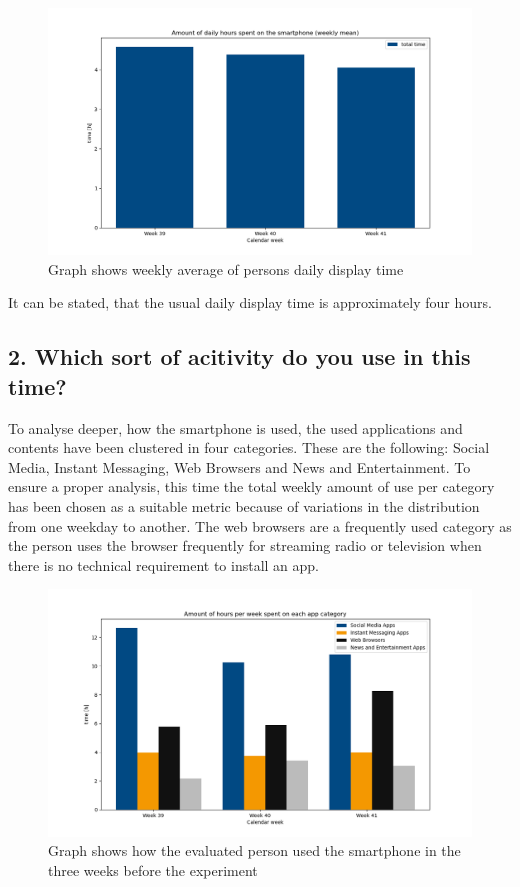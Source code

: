 \documentclass[11pt,letterpaper]{article}
\begin{document}
\begin{figure}[h]
\centering
\includegraphics[width = \textwidth]{../data/usage-times-total.png}
\caption{Graph shows weekly average of persons daily display time}
\end{figure}

It can be stated, that the usual daily display time is approximately four hours.

\subsection*{2. Which sort of acitivity do you use in this time?}
To analyse deeper, how the smartphone is used, the used applications and contents have been clustered in four categories. These are the following: Social Media, Instant Messaging, Web Browsers and News and Entertainment. To ensure a proper analysis, this time the total weekly amount of use per category has been chosen as a suitable metric because of variations in the distribution from one weekday to another. The web browsers are a frequently used category as the person uses the browser frequently for streaming radio or television when there is no technical requirement to install an app.

\begin{figure}[h]
\centering
\includegraphics[width = \textwidth]{../data/usage-times.png}
\caption{Graph shows how the evaluated person used the smartphone in the three weeks before the experiment}
\end{figure}
\end{document}
